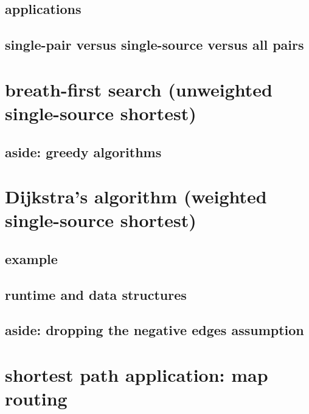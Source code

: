 

\subsection{applications}



\subsection{single-pair versus single-source versus all pairs}



%

\section{breath-first search (unweighted single-source shortest)}



\subsection{aside: greedy algorithms}


\section{Dijkstra's algorithm (weighted single-source shortest)}



\subsection{example}



\subsection{runtime and data structures}



\subsection{aside: dropping the negative edges assumption}



\section{shortest path application: map routing} %

